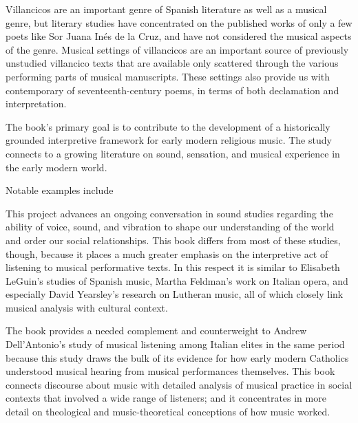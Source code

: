 \documentclass{vcbook-proposal}
\begin{document}
Villancicos are an important genre of Spanish literature as well as a musical 
genre, but literary studies have concentrated on the published works 
of only a few poets like Sor Juana Inés de la Cruz, and have not 
considered the musical aspects of the genre.%
  \Autocite{Tenorio:SorJuana}
Musical settings of villancicos are an important source of previously unstudied 
villancico texts that are available only scattered through the various 
performing parts of musical manuscripts.
These settings also provide us with contemporary  of 
seventeenth-century poems, in terms of both declamation and interpretation.

The book's primary goal is to contribute to the development of a historically 
grounded interpretive framework for early modern religious music.
The study connects to a growing literature on sound, sensation, and musical 
experience in the early modern world.%
  \begin{Footnote}
      Notable examples include \autocites{Rath:EarlyAmerica}{Feldman:Passions}
      {Austern:Nature}{Gouk:MusicScienceMagic}
  \end{Footnote}
This project advances an ongoing conversation in sound studies regarding the ability of
voice, sound, and vibration to shape our understanding of the world and order our social
relationships.%
    \Autocites{Ochoa:Aurality}{Eidsheim:SensingSound}
This book differs from most of these studies, though, because it places a much
greater emphasis on the interpretive act of listening to musical performative
texts.
In this respect it is similar to Elisabeth LeGuin's studies of Spanish music,
Martha Feldman's work on Italian opera, and especially David Yearsley's research
on Lutheran music, all of which closely link musical analysis with cultural
context.%
    \Autocites{LeGuin:Tonadilla}{LeGuin:BoccheriniBody}
    {Feldman:Opera}{Yearsley:BachCounterpoint}

The book provides a needed complement and counterweight to Andrew
Dell'Antonio's study of musical listening among Italian elites in the same
period because this study draws the bulk of its evidence for how early modern
Catholics understood musical hearing from musical performances themselves.%
    \Autocite{DellAntonio:Listening}
This book connects discourse about music with detailed analysis of musical
practice in social contexts that involved a wide range of listeners; and it
concentrates in more detail on theological and music-theoretical conceptions
of how music worked.
\end{document}
